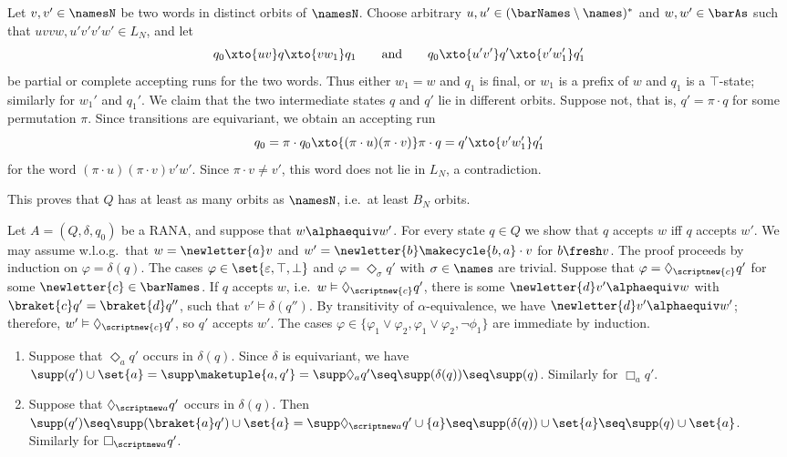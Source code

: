 \documentclass[10pt, final, conference, a4paper, twocolumn]{IEEEtran}
\begin{document}
 Let $v,v'\in \namesN$ be two words in distinct orbits of $\namesN$. Choose arbitrary $u,u' \in (\barNames\setminus\names)^*$ and $w,w'\in \barAs$ such that $uvvw,u'v'v'w'\in L_N$, and let
\[ q_0\xto{uv} q\xto {vw_1} q_1 \qquad\text{and}\qquad q_0 \xto{u'v'} q' \xto{v'w_1'} q_1' \]
be partial or complete accepting runs for the two words. Thus either $w_1=w$ and $q_1$ is
final, or $w_1$ is a prefix of $w$ and $q_1$ is a $\top$-state; similarly for $w_1'$ and
$q_1'$. We claim that the two intermediate states $q$ and $q'$ lie in different orbits. Suppose not, that is, $q'=\pi\cdot q$ for some permutation $\pi$. Since transitions are equivariant, we obtain an accepting run
\[ q_0 = \pi\cdot q_0 \xto{(\pi\cdot u)(\pi\cdot v)} \pi\cdot q = q' \xto{v'w_1'} q_1' \]
for the word $(\pi\cdot u)(\pi\cdot v) v'w'$. Since $\pi\cdot v\neq v'$, this word does not lie in $L_N$, a contradiction. 

This proves that $Q$ has at least as many orbits as $\namesN$, i.e.~at least $B_N$ orbits. 





\begin{IEEEproof}
Let $A=(Q,\delta,q_0)$ be a RANA, and suppose that $w \alphaequiv w'$.
  For every state $q\in Q$ we show that $q$ accepts $w$ iff $q$ accepts $w'$. We may assume w.l.o.g.~that $w = \newletter{a}v$ and $w' = \newletter{b}\makecycle{b,a}\cdot v$ for $b \fresh v$. The proof proceeds by induction on $\varphi = \delta(q)$. The cases $\varphi \in \set{\varepsilon,\top,
    \bot}$ and $\varphi = \Diamond_\sigma q'$ with $\sigma \in \names$ are trivial.
  Suppose that $\varphi = \Diamond_{\scriptnew{c}} q'$ for some $\newletter{c} \in \barNames$.
  If $q$ accepts $w$, i.e.~$w\vDash\Diamond_{\scriptnew{c}}q'$, there is some $\newletter{d}v' \alphaequiv w$ with $\braket{c}q'  = \braket{d}q''$, such that $v' \vDash \delta(q'')$.
 By transitivity of $\alpha$-equivalence, we have $\newletter{d}v' \alphaequiv w'$; therefore, $w'\vDash\Diamond_{\scriptnew{c}}q'$, so $q'$ accepts $w'$.
  The cases $\varphi\in \{\varphi_1\vee \varphi_2, \varphi_1\vee \varphi_2, \neg \phi_1\}$ are immediate by induction.
\end{IEEEproof}

\begin{IEEEproof}
    \begin{enumerate}
        \item Suppose that $\Diamond_a q'$ occurs in $\delta(q)$. Since $\delta$ is equivariant, we have $\supp(q') \cup \set{a} = \supp\maketuple{a,q'} = \supp \Diamond_a q' \seq \supp(\delta(q)) \seq \supp(q)$. Similarly for $\Box_a q'$.
        \item Suppose that $\Diamond_{\scriptnew a} q'$ occurs in $\delta(q)$. Then  $\supp(q') \seq \supp(\braket{a}q') \cup \set{a} = \supp \Diamond_{\scriptnew a} q' \cup \{a\} \seq \supp(\delta(q)) \cup \set{a}
            \seq \supp(q) \cup \set{a}$. Similarly for $\Box_{\scriptnew a} q'$. \hfill\IEEEQEDhere
    \end{enumerate}
\end{IEEEproof}
\end{document}
